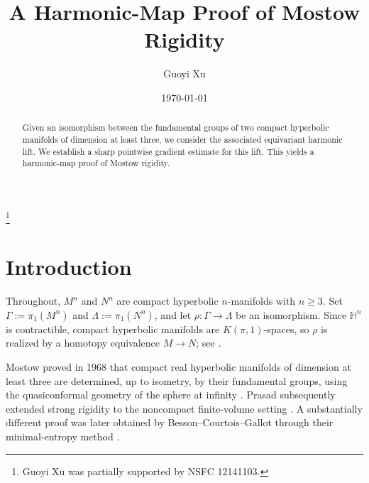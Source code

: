 \documentclass[11pt]{amsart}
\theoremstyle{plain}
\theoremstyle{plain}
\theoremstyle{plain}
\newcommand{\Hn}{\mathbb H^n}
\numberwithin{equation}{section}
\begin{document}
\title[A Harmonic-Map Proof of Mostow Rigidity]
{A Harmonic-Map Proof of Mostow Rigidity}
\author{Guoyi Xu}
\address{Department of Mathematical Sciences\\Tsinghua University, Beijing\\P. R. China}
\date{\today}
\begin{abstract}
Given an isomorphism between the fundamental groups of two compact
hyperbolic manifolds of dimension at least three, we consider the
associated equivariant harmonic lift.  We establish a sharp pointwise gradient estimate for this lift. This yields a harmonic-map proof of Mostow
rigidity.
\end{abstract}

\thanks{Guoyi Xu was partially supported by NSFC 12141103.}
\maketitle


\tableofcontents




\section{Introduction}\label{sec:statement}

Throughout, \(M^n\) and \(N^n\) are compact hyperbolic
\(n\)-manifolds with \(n\geq3\).  Set
\(\Gamma:=\pi_1(M^n)\) and \(\Lambda:=\pi_1(N^n)\), and let
\(\rho:\Gamma\longrightarrow\Lambda\) be an isomorphism.
Since \(\Hn\) is contractible, compact hyperbolic manifolds are
\(K(\pi,1)\)-spaces, so \(\rho\) is realized by a homotopy equivalence
\(M\to N\); see \cite[Proposition~1B.9]{Hatcher}.

Mostow proved in 1968 that compact real hyperbolic manifolds of dimension
at least three are determined, up to isometry, by their fundamental
groups, using the quasiconformal geometry of the sphere at infinity
\cite{Mostow1968}.  Prasad subsequently extended strong rigidity to the
noncompact finite-volume setting \cite{Prasad1973}.  A substantially
different proof was later obtained by Besson--Courtois--Gallot through
their minimal-entropy method \cite{BessonCourtoisGallot}.
\end{document}
